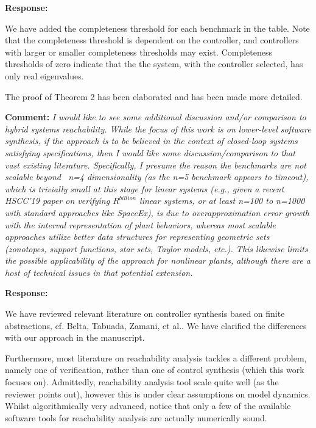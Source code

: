 \documentclass{article}
\begin{document}
\vspace{1em}

{\bf Response: }

We have added the completeness threshold for each benchmark in the table. Note that the completeness threshold is dependent on the controller, 
and controllers with larger or smaller completeness thresholds may exist. Completeness thresholds of zero indicate that the the system, with the controller
selected, has only real eigenvalues.

The proof of Theorem 2 has been elaborated and has been made more detailed. 


\vspace{2em}

{\bf Comment: }
{\itshape I would like to see some additional discussion and/or comparison to hybrid systems reachability. While the focus of this work is on
lower-level
software synthesis, if the approach is to be believed in the context of closed-loop systems satisfying specifications, then I would like some
discussion/comparison to that vast existing literature. Specifically, I presume the reason the benchmarks are not scalable beyond ~n=4 dimensionality
(as the n=5 benchmark appears to timeout), which is trivially small at this stage for linear systems (e.g., given a recent HSCC'19 paper on verifying
$R^{billion}$ linear systems, or at least n=100 to n=1000 with standard approaches like SpaceEx), is due to overapproximation error growth with the
interval representation of plant behaviors, whereas most scalable approaches utilize better data structures for representing geometric sets
(zonotopes, support functions, star sets, Taylor models, etc.). This likewise limits the possible applicability of the
approach for nonlinear plants, although there are a host of technical issues in that potential extension. }

\vspace{1em}
{\bf Response: }

We have reviewed relevant literature on controller synthesis based on finite abstractions, cf. Belta, Tabuada, Zamani, et al.. We have clarified the differences with our approach in the manuscript. 

Furthermore, most literature on reachability analysis tackles a different problem, namely one of verification, rather than one of control synthesis (which this work
focuses on). Admittedly, reachability analysis tool scale quite well (as the reviewer points out), however this is under clear assumptions on model dynamics. 
Whilst algorithmically very advanced, notice that only a few of the available software tools for reachability analysis are actually numerically sound. 
\end{document}
